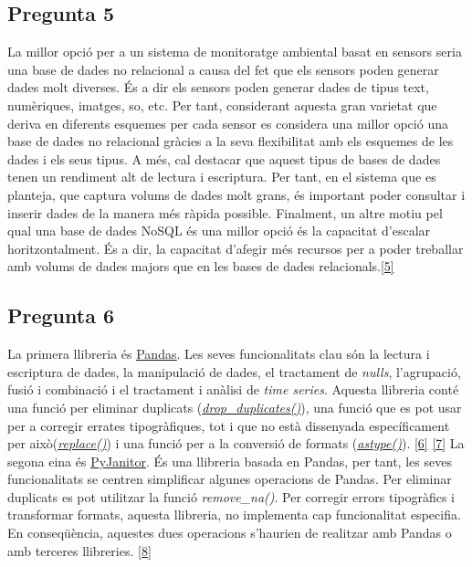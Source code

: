 \documentclass[a4paper,12pt]{report}
\begin{document}
\subsection*{Pregunta 5}
La millor opció per a un sistema de monitoratge ambiental basat en sensors seria una base de dades no relacional a causa del fet que els sensors poden generar dades molt diverses. És a dir els sensors poden generar dades de tipus text, numèriques, imatges, so, etc. Per tant, considerant aquesta gran varietat que deriva en diferents esquemes per cada sensor es considera una millor opció una base de dades no relacional gràcies a la seva flexibilitat amb els esquemes de les dades i els seus tipus. A més, cal destacar que aquest tipus de bases de dades tenen un rendiment alt de lectura i escriptura. Per tant, en el sistema que es planteja, que captura volums de dades molt grans, és important poder consultar i inserir dades de la manera més ràpida possible. Finalment, un altre motiu pel qual una base de dades NoSQL és una millor opció és la capacitat d'escalar horitzontalment. És a dir, la capacitat d'afegir més recursos per a poder treballar amb volums de dades majors que en les bases de dades relacionals.\hyperlink{ref:biblio-nosql}{[5]}
\subsection*{Pregunta 6}
La primera llibreria és \href{https://pandas.pydata.org/docs/}{\underline{Pandas}}. Les seves funcionalitats clau són la lectura i escriptura de dades, la manipulació de dades, el tractament de \textit{nulls}, l'agrupació, fusió i combinació i el tractament i anàlisi de \textit{time series}. Aquesta llibreria conté una funció per eliminar duplicats (\href{https://pandas.pydata.org/docs/reference/api/pandas.DataFrame.drop_duplicates.html}{\underline{\textit{drop\_duplicates()}}}), una funció que es pot usar per a corregir errates tipogràfiques, tot i que no està dissenyada específicament per això(\href{https://pandas.pydata.org/docs/reference/api/pandas.DataFrame.replace.html}{\underline{\textit{replace()}}}) i una funció per a la conversió de formats (\href{https://pandas.pydata.org/docs/reference/api/pandas.DataFrame.astype.html}{\underline{\textit{astype()}}}). \hyperlink{ref:biblio-pandas-basic}{[6]} \hyperlink{ref:biblio-pandas-transform}{[7]}
La segona eina és \href{https://pyjanitor-devs.github.io/pyjanitor/}{\underline{PyJanitor}}. És una llibreria basada en Pandas, per tant, les seves funcionalitats se centren simplificar algunes operacions de Pandas. Per eliminar duplicats es pot utilitzar la funció \textit{remove\_na()}. Per corregir errors tipogràfics i transformar formats, aquesta llibreria, no implementa cap funcionalitat especifia. En conseqüència, aquestes dues operacions s'haurien de realitzar amb Pandas o amb terceres llibreries. \hyperlink{ref:biblio-data-cleaning}{[8]}
\end{document}
